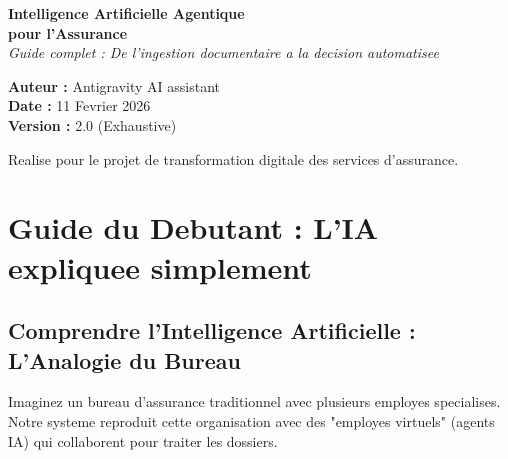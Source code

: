 \documentclass[a4paper,12pt]{article}
\begin{document}
\begin{titlepage}
    \centering
    \vspace*{2cm}
    {\Huge\bfseries\color{techblue} Intelligence Artificielle Agentique \\ pour l'Assurance}\\[0.5cm]
    {\Large\itshape Guide complet : De l'ingestion documentaire a la decision automatisee}\\[1.5cm]
    
    \begin{center}
    \end{center}
    
    \vspace{2cm}
    \textbf{Auteur :} Antigravity AI assistant\\
    \textbf{Date :} 11 Fevrier 2026\\
    \textbf{Version :} 2.0 (Exhaustive)
    
    \vspace{2cm}
    \begin{abstract}
        Ce document constitue le manuel de reference pour comprendre et maintenir le systeme d'automatisation des sinistres. Il explique de maniere pedagogique chaque concept (RAG, Agents, Vector DB) et detaille l'implementation de chaque besoin fonctionnel du cahier des charges.
    \end{abstract}
    
    \vfill
    {\small Realise pour le projet de transformation digitale des services d'assurance.}
\end{titlepage}

\newpage
\tableofcontents
\newpage

\section{Guide du Debutant : L'IA expliquee simplement}

\subsection{Comprendre l'Intelligence Artificielle : L'Analogie du Bureau}
Imaginez un bureau d'assurance traditionnel avec plusieurs employes specialises. Notre systeme reproduit cette organisation avec des "employes virtuels" (agents IA) qui collaborent pour traiter les dossiers.
\end{document}
